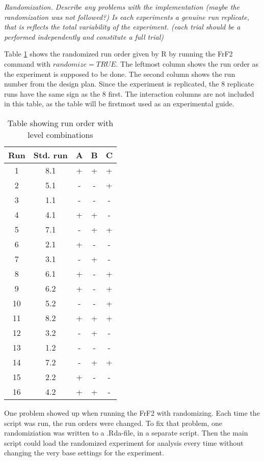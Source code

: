 \textit{ Randomization.
Describe any problems with the implementation (maybe the randomization was not followed?)
Is each experiments a genuine run replicate, that is reflects the total variability of the experiment. (each trial should be a performed independently and constitute a full trial)}

Table \ref{table:random} shows the randomized run order given by R by running the FrF2 command with $randomize=TRUE$. The leftmost column shows the run order as the experiment is supposed to be done. The second column shows the run number from the design plan. Since the experiment is replicated, the 8 replicate runs have the same sign as the 8 first. The interaction columns are not included in this table, as the table will be firstmost used as an experimental guide.

\begin{table}[H]
\centering
\begin{tabular}{ |c|c|ccc| } 
 \hline
 Run & Std. run & A & B & C \\ 
    \hline
    1 & 8.1 & + & + & +  \\
    2 & 5.1 & - & - & +  \\
    3 & 1.1 & - & - & -  \\
    4 & 4.1 & + & + & -  \\
    5 & 7.1 & - & + & +  \\
    6 & 2.1 & + & - & -  \\
    7 & 3.1 & - & + & -  \\
    8 & 6.1 & + & - & +  \\
    9 & 6.2 & + & - & +  \\
    10 & 5.2 & - & - & +  \\
    11 & 8.2 & + & + & +  \\
    12 & 3.2 & - & + & -  \\
    13 & 1.2 & - & - & -  \\
    14 & 7.2 & - & + & +  \\
    15 & 2.2 & + & - & -  \\
    16 & 4.2 & + & + & -  \\
     \hline
\end{tabular}
\caption{Table showing run order with level combinations}
\label{table:random}
\end{table}

One problem showed up when running the FrF2 with randomizing. Each time the script was run, the run orders were changed. To fix that problem, one randomiziation was written to a .Rda-file, in a separate script. Then the main script could load the randomized experiment for analysis every time without changing the very base settings for the experiment. 

